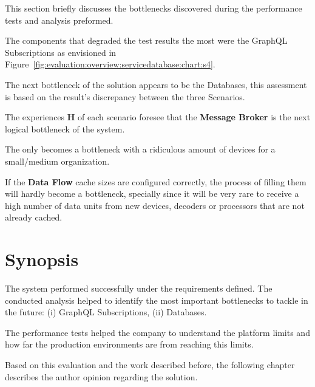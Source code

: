 This section briefly discusses the bottlenecks discovered during the performance tests and analysis preformed.

The components that degraded the test results the most were the GraphQL Subscriptions as envisioned in Figure~\ref{fig:evaluation:overview:servicedatabase:chart:s4}.

The next bottleneck of the solution appears to be the  Databases, this assessment is based on the result's discrepancy between the three Scenarios.

The experiences \textbf{H} of each scenario foresee that the \textbf{Message Broker} is the next logical bottleneck of the system.

The  only becomes a bottleneck with a ridiculous amount of devices for a small/medium organization. 

If the \textbf{Data Flow} cache sizes are configured correctly, the process of filling them will hardly become a bottleneck, specially since it will be very rare to receive a high number of data units from new devices, decoders or processors that are not already cached.

\section{Synopsis}
\label{sec:evaluation:synopsis}

The system performed successfully under the requirements defined. The conducted analysis helped to identify the most important bottlenecks to tackle in the future: (i) GraphQL Subscriptions, (ii)  Databases. 

The performance tests helped the company to understand the platform limits and how far the production environments are from reaching this limits.

Based on this evaluation and the work described before, the following chapter describes the author opinion regarding the solution.
